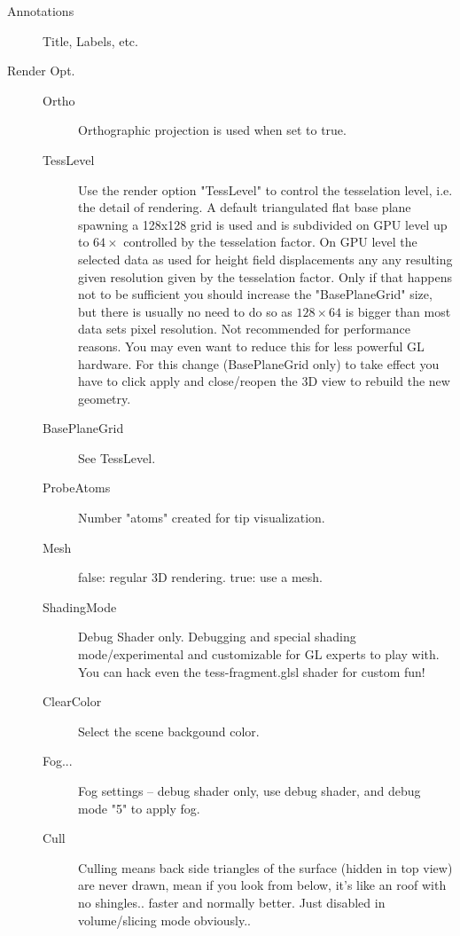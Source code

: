 \begin{description}
	\item[Annotations] Title, Labels, etc.
	\item[Render Opt.] 
	\begin{description}
		\item[Ortho] Orthographic projection is used when set to true.
		\item[TessLevel] Use the render option "TessLevel" to control the tesselation level, i.e. the detail of rendering.
		A default triangulated flat base plane spawning a 128x128 grid is used and is subdivided on GPU level up to $64\times$ controlled by the tesselation factor. On GPU level the selected data as used for height field displacements any any resulting given resolution given by the tesselation factor. Only if that happens not to be sufficient you should increase the "BasePlaneGrid" size, but there is usually no need to do so as $128 \times 64$ is bigger than most data sets pixel resolution. Not recommended for performance reasons. You may even want to reduce this for less powerful GL hardware. For this change (BasePlaneGrid only) to take effect you have to click apply and close/reopen the 3D view to rebuild the new geometry.
		\item[BasePlaneGrid] See TessLevel.
		\item[ProbeAtoms] Number "atoms" created for tip visualization.
		\item[Mesh] false: regular 3D rendering. true: use a mesh.
		\item[ShadingMode] Debug Shader only. Debugging and special shading mode/experimental and customizable for GL experts to play with. You can hack even the tess-fragment.glsl shader for custom fun!
		\item[ClearColor] Select the scene backgound color.
		\item[Fog...] Fog settings -- debug shader only, use debug shader, and debug mode "5" to apply fog.
		\item[Cull] Culling means back side triangles of the surface (hidden in top view) are never drawn, mean if you look from below, it's like an roof with no shingles.. faster and normally better. Just disabled in volume/slicing mode obviously..
	
	\end{description}
\end{description}


